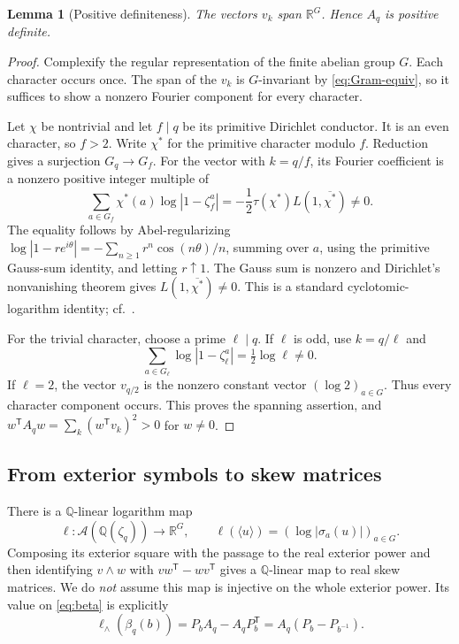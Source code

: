 \documentclass[11pt]{article}
\numberwithin{equation}{section}
\newtheorem{lemma}[theorem]{Lemma}
\theoremstyle{definition}
\theoremstyle{remark}
\newcommand{\Q}{\mathbb Q}
\newcommand{\R}{\mathbb R}
\newcommand{\Acal}{\mathcal A}
\newcommand{\cl}[1]{\langle #1\rangle}
\begin{document}
\begin{lemma}[Positive definiteness]\label{lem:positive-Gram}
The vectors $v_k$ span $\R^G$. Hence $A_q$ is positive definite.
\end{lemma}
\begin{proof}
Complexify the regular representation of the finite abelian group $G$.
Each character occurs once. The span of the $v_k$ is $G$-invariant by
\eqref{eq:Gram-equiv}, so it suffices to show a nonzero Fourier component
for every character.

Let $\chi$ be nontrivial and let $f\mid q$ be its primitive Dirichlet
conductor. It is an even character, so $f>2$. Write $\chi^*$ for the
primitive character modulo $f$. Reduction gives a surjection
$G_q\longrightarrow G_f$. For the vector with $k=q/f$, its Fourier
coefficient is a nonzero positive integer multiple of
\begin{equation}\label{eq:log-L}
 \sum_{a\in G_f}\chi^*(a)\log|1-\zeta_f^a|
 =-\frac12\tau(\chi^*)L(1,\overline{\chi^*})\ne0.
\end{equation}
The equality follows by Abel-regularizing
$\log|1-re^{i\theta}|=-\sum_{n\ge1}r^n\cos(n\theta)/n$,
summing over $a$, using the primitive Gauss-sum identity, and letting
$r\uparrow1$. The Gauss sum is nonzero and Dirichlet's nonvanishing
theorem gives $L(1,\overline{\chi^*})\ne0$. This is a standard
cyclotomic-logarithm identity; cf.\ \cite{Washington,Sharifi}.

For the trivial character, choose a prime $\ell\mid q$. If $\ell$ is
odd, use $k=q/\ell$ and
\[
 \sum_{a\in G_\ell}\log|1-\zeta_\ell^a|
 =\tfrac12\log\ell\ne0.
\]
If $\ell=2$, the vector $v_{q/2}$ is the nonzero constant vector
$(\log2)_{a\in G}$. Thus every character component occurs. This proves
the spanning assertion, and
$w^{\mathsf T}A_qw=\sum_k(w^{\mathsf T}v_k)^2>0$ for $w\ne0$.
\end{proof}

\subsection{From exterior symbols to skew matrices}

There is a $\Q$-linear logarithm map
\[
 \ell:\Acal(\Q(\zeta_q))\longrightarrow\R^G,
 \qquad\ell(\cl u)=(\log|\sigma_a(u)|)_{a\in G}.
\]
Composing its exterior square with the passage to the real exterior
power and then identifying $v\wedge w$ with
$vw^{\mathsf T}-wv^{\mathsf T}$ gives a $\Q$-linear map to real skew
matrices. We do \emph{not} assume this map is injective on the whole
exterior power. Its value on \eqref{eq:beta} is explicitly
\begin{equation}\label{eq:skew-image}
 \ell_\wedge(\beta_q(b))
 =P_bA_q-A_qP_b^{\mathsf T}
 =A_q(P_b-P_{b^{-1}}).
\end{equation}
\end{document}
